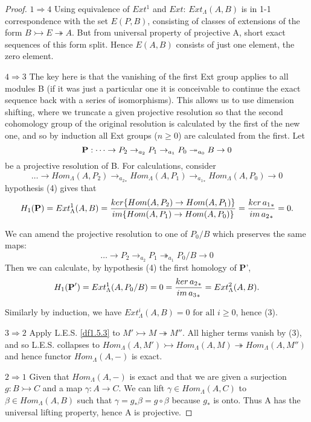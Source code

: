 \begin{proof}
\textbf{$1\Longrightarrow 4$} Using equivalence of $Ext^1$ and
$Ext$: $Ext_\Lambda(A,B)$ is in 1-1 correspondence with the set
$E(P,B)$, consisting of classes of extensions of the form
$B\rightarrowtail E\twoheadrightarrow A$. But from universal
property of projective A, short exact sequences of this form
split. Hence $E(A,B)$ consists of just one element, the zero
element.


 \textbf{$4\Longrightarrow 3$} The key here is that the vanishing
 of the first Ext group applies to all modules B (if it was just a
 particular one it is conceivable to continue the exact sequence
 back with a series of isomorphisms). This allows us to use
 dimension shifting, where we truncate a given projective
 resolution so that the second cohomology group of the original
 resolution is calculated by the first of the new one, and so by
 induction all Ext groups ($n\geq 0$) are calculated from the
 first.
 Let $$\textbf P: \dots \rightarrow P_2 \rightarrow _{a_2} P_1
 \rightarrow_{a_1} P_0 \twoheadrightarrow_{a_0}B \rightarrow 0$$
 be a projective resolution of B. For calculations, consider
$$\dots \rightarrow  Hom_\Lambda(A,P_2) \rightarrow _{{a_2}_*}
Hom_\Lambda(A,P_1) \rightarrow_{{a_1}_*} Hom_\Lambda(A,P_0)
\rightarrow 0$$ hypothesis (4) gives that
$$H_1(\textbf P)= Ext_\Lambda^1(A,B) = \frac{ker \{ Hom(A,P_2)\rightarrow
Hom(A,P_1)\}}{im \{ Hom(A,P_1)\rightarrow Hom(A,P_0)\}} =
\frac{ker\,{a_1}_*}{im\,{a_2}_*}=0.$$

We can amend the projective resolution to one of $P_0/B$ which
preserves the same maps:
$$\dots \rightarrow P_2 \rightarrow _{a_2} P_1
 \twoheadrightarrow_{a_1} P_0/B \rightarrow 0$$
 Then we can calculate, by hypothesis (4) the first homology of \textbf P',
$$H_1(\textbf P')=Ext_\Lambda^1(A,P_0/B) =0 = \frac{ker\,{a_2}_*}{im\,{a_3}_*}
= Ext_\Lambda^2(A,B).$$ 

Similarly by induction, we have
$Ext^i_\Lambda (A,B)=0\text{ for all } i\geq 0$, hence (3).

\textbf{$3\Longrightarrow 2$} Apply L.E.S. \ref{df1.5.3} to
$M'\rightarrowtail M \twoheadrightarrow M''$. All higher terms
vanish by (3), and so L.E.S. collapses to $Hom_\Lambda
(A,M')\rightarrowtail Hom_\Lambda (A,M)\twoheadrightarrow
Hom_\Lambda (A,M'')$ and hence functor $Hom_\Lambda (A,-)$ is
exact.

\textbf{$2\Longrightarrow 1$} Given that $Hom_\Lambda (A,-)$ is
exact and that we are given a surjection $g:B\rightarrowtail C$
and a map $\gamma :A\rightarrow C$. We can lift $\gamma\in
Hom_\Lambda (A,C)$ to $\beta \in Hom_\Lambda (A,B)$ such that
$\gamma = g_* \beta = g \circ \beta$ because $g_*$ is onto. Thus A
has the universal lifting property, hence A is projective.

\end{proof}


